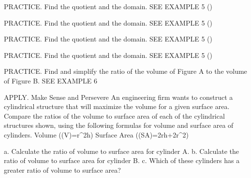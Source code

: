 \documentclass{article}
\newenvironment{practice}[2]{}{}        %
\newcommand{\answer}[1]{}               %
\newcommand{\placeholder}[2]{}          %
\newcommand{\te}[1]{}                   %
\begin{document}
\begin{practice}{30}{1}
PRACTICE. Find the quotient and the domain. SEE EXAMPLE 5
(\div{})
\answer{(\frac{(y+4)(y+2)}{3(y-5)}) for all (y) except 4 and 5.}
\te{Printed domain omits y=-2, where the divisor's denominator is zero.}
\end{practice}
\begin{practice}{31}{1}
PRACTICE. Find the quotient and the domain. SEE EXAMPLE 5
(\div{})
\answer{(\frac{(x-y)^3}{3(x+y)}) for all (x) except (x=-y).}
\te{Printed domain omits x=y, where the divisor's denominator is zero.}
\end{practice}
\begin{practice}{32}{1}
PRACTICE. Find the quotient and the domain. SEE EXAMPLE 5
(\div{})
\answer{(\frac{5x+2}{x-3}) for all (x) except -3, (\frac25), and 3.}
\end{practice}
\begin{practice}{33}{1}
PRACTICE. Find the quotient and the domain. SEE EXAMPLE 5
(\div{})
\answer{(\frac{x(x+6)}{x+3}); (x\neq-6,-3,0,5,6).}
\end{practice}
\begin{practice}{34}{1}
PRACTICE. Find and simplify the ratio of the volume of Figure A to the volume of Figure B. SEE EXAMPLE 6
\placeholder{diagram}{Two cream rectangular prisms in perspective. Figure A is horizontal, front bottom length 3x, depth x, height x+1. Figure B is upright, front bottom length x+2, depth x, height 2x. Dimension labels are red.}
\answer{(\frac{3(x+1)}{2(x+2)}) for all (x>0).}
\end{practice}
\te{Printed footer: See answers for Exercises 14--18, 20--21, 26--27 and 31 on next page. These answers have been placed with their exercises.}
\begin{practice}{35}{1}
APPLY. Make Sense and Persevere An engineering firm wants to construct a cylindrical structure that will maximize the volume for a given surface area. Compare the ratios of the volume to surface area of each of the cylindrical structures shown, using the following formulas for volume and surface area of cylinders.
Volume ((V)=\pi r^2h)
Surface Area ((SA)=2\pi rh+2\pi r^2)
\placeholder{diagram}{Two upright cream cylinders, A at left shorter with height 2r, B at right taller with height 3r. Each base radius is a red horizontal segment labeled r. Hidden back halves of bottom ellipses dashed.}
a. Calculate the ratio of volume to surface area for cylinder A.
b. Calculate the ratio of volume to surface area for cylinder B.
c. Which of these cylinders has a greater ratio of volume to surface area?
\answer{a. (\frac r3). b. (\frac{3r}8). c. cylinder B; (\frac38r>\frac13r).}
\end{practice}
\end{document}
